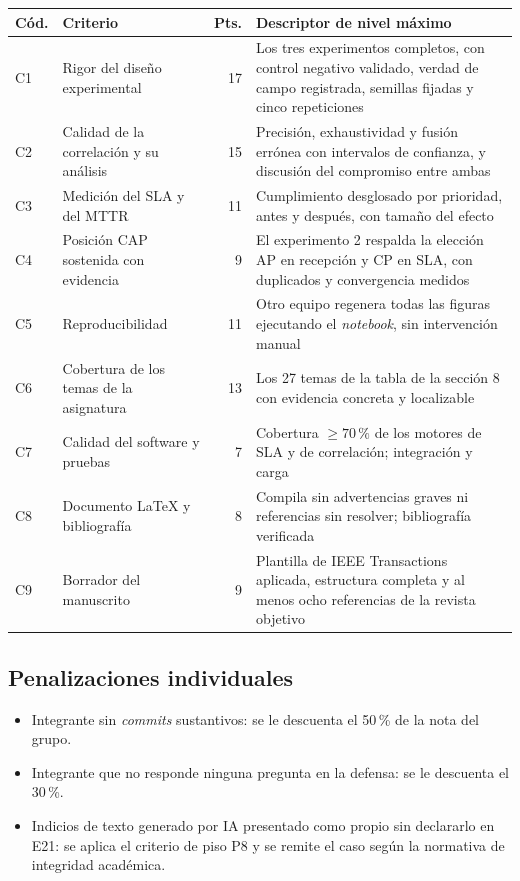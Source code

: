 \documentclass[11pt,a4paper]{article}
\begin{document}
\begin{center}
	\small
	\begin{longtable}{@{}p{0.9cm}p{5.6cm}rp{6.6cm}@{}}
		\toprule
		\textbf{Cód.} & \textbf{Criterio} & \textbf{Pts.} & \textbf{Descriptor de nivel máximo} \\
		\midrule
		\endhead
		C1 & Rigor del diseño experimental & 17 & Los tres experimentos completos, con control negativo validado, verdad de campo registrada, semillas fijadas y cinco repeticiones \\
		\addlinespace
		C2 & Calidad de la correlación y su análisis & 15 & Precisión, exhaustividad y fusión errónea con intervalos de confianza, y discusión del compromiso entre ambas \\
		\addlinespace
		C3 & Medición del SLA y del MTTR & 11 & Cumplimiento desglosado por prioridad, antes y después, con tamaño del efecto \\
		\addlinespace
		C4 & Posición CAP sostenida con evidencia & 9 & El experimento 2 respalda la elección AP en recepción y CP en SLA, con duplicados y convergencia medidos \\
		\addlinespace
		C5 & Reproducibilidad & 11 & Otro equipo regenera todas las figuras ejecutando el \emph{notebook}, sin intervención manual \\
		\addlinespace
		C6 & Cobertura de los temas de la asignatura & 13 & Los 27 temas de la tabla de la sección 8 con evidencia concreta y localizable \\
		\addlinespace
		C7 & Calidad del software y pruebas & 7 & Cobertura $\geq 70\,\%$ de los motores de SLA y de correlación; integración y carga \\
		\addlinespace
		C8 & Documento LaTeX y bibliografía & 8 & Compila sin advertencias graves ni referencias sin resolver; bibliografía verificada \\
		\addlinespace
		C9 & Borrador del manuscrito & 9 & Plantilla de IEEE Transactions aplicada, estructura completa y al menos ocho referencias de la revista objetivo \\
		\bottomrule
	\end{longtable}
\end{center}

\subsection{Penalizaciones individuales}

\begin{itemize}[leftmargin=*,itemsep=3pt]
	\item Integrante sin \emph{commits} sustantivos: se le descuenta el 50\,\% de la nota del grupo.
	\item Integrante que no responde ninguna pregunta en la defensa: se le descuenta el 30\,\%.
	\item Indicios de texto generado por IA presentado como propio sin declararlo en E21: se aplica el criterio de piso P8 y se remite el caso según la normativa de integridad académica.
\end{itemize}
\end{document}
